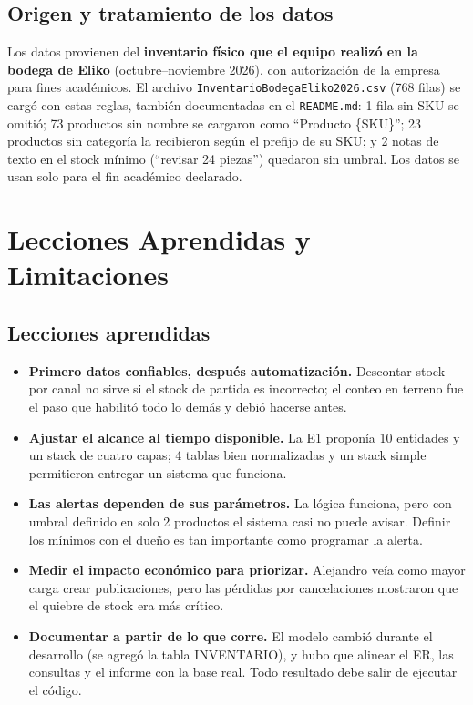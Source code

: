 \documentclass[11pt,letterpaper]{article}
\renewcommand{\_}{\oldus\allowbreak}
\begin{document}
\subsection{Origen y tratamiento de los datos}
Los datos provienen del \textbf{inventario físico que el equipo realizó en la bodega de Eliko} (octubre–noviembre 2026), con autorización de la empresa para fines académicos. El archivo \texttt{Inventario\_Bodega\_Eliko\_14\_10\_2026.csv} (768 filas) se cargó con estas reglas, también documentadas en el \texttt{README.md}: 1 fila sin SKU se omitió; 73 productos sin nombre se cargaron como “Producto \{SKU\}”; 23 productos sin categoría la recibieron según el prefijo de su SKU; y 2 notas de texto en el stock mínimo (“revisar 24 piezas”) quedaron sin umbral. Los datos se usan solo para el fin académico declarado.

\section{Lecciones Aprendidas y Limitaciones}
\subsection{Lecciones aprendidas}
\begin{itemize}
\item \textbf{Primero datos confiables, después automatización.} Descontar stock por canal no sirve si el stock de partida es incorrecto; el conteo en terreno fue el paso que habilitó todo lo demás y debió hacerse antes.
\item \textbf{Ajustar el alcance al tiempo disponible.} La E1 proponía 10 entidades y un stack de cuatro capas; 4 tablas bien normalizadas y un stack simple permitieron entregar un sistema que funciona.
\item \textbf{Las alertas dependen de sus parámetros.} La lógica funciona, pero con umbral definido en solo 2 productos el sistema casi no puede avisar. Definir los mínimos con el dueño es tan importante como programar la alerta.
\item \textbf{Medir el impacto económico para priorizar.} Alejandro veía como mayor carga crear publicaciones, pero las pérdidas por cancelaciones mostraron que el quiebre de stock era más crítico.
\item \textbf{Documentar a partir de lo que corre.} El modelo cambió durante el desarrollo (se agregó la tabla INVENTARIO), y hubo que alinear el ER, las consultas y el informe con la base real. Todo resultado debe salir de ejecutar el código.
\end{itemize}
\end{document}
